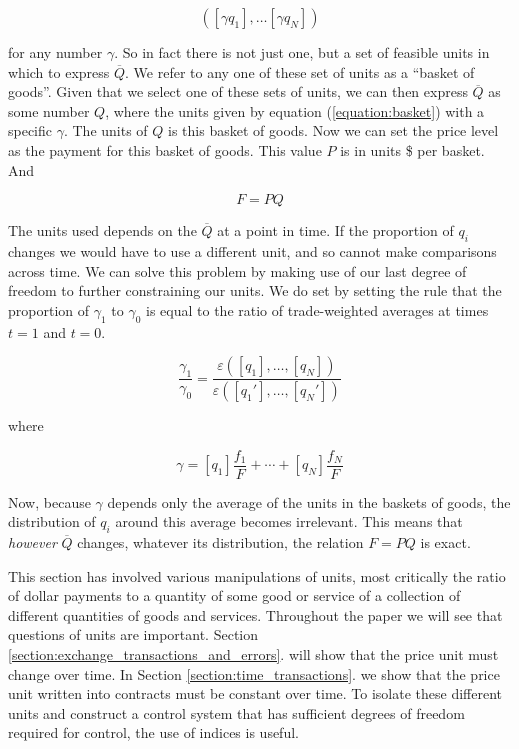 \begin{equation}\label{equation:basket}
    \left( \left[ \gamma q_1 \right], \dots \left[ \gamma q_N \right] \right)
\end{equation}

for any number $\gamma$. So in fact there is not just one, but a set of feasible units in which to
express $\overline Q$. We refer to any one of these set of units as a ``basket of goods''. Given
that we select one of these sets of units, we can then express $\overline Q$ as some number $Q$,
where the units given by equation (\ref{equation:basket}) with a specific $\gamma$. The units of
$Q$ is this basket of goods. Now we can set the price level as the payment for this basket of goods.
This value $P$ is in units \$ per basket. And

\begin{equation} \label{eq:fpq}
   F = PQ
\end{equation}

The units used depends on the $\overline Q$ at a point in time. If the proportion of $q_i$ changes
we would have to use a different unit, and so cannot make comparisons across time. We can solve this
problem by making use of our last degree of freedom to further constraining our units. We do set by
setting the rule that the proportion of $\gamma_1$ to $\gamma_0$ is equal to the ratio of
trade-weighted averages at times $t=1$ and $t=0$. 

\begin{equation}
    \frac {\gamma_1} {\gamma_0} = \frac {\varepsilon \left( \left[ q_1 \right], \dots, \left[ q_N \right] \right)}
    {\varepsilon \left( \left[ {q_1}' \right], \dots, \left[ {q_N}' \right] \right)}
\end{equation}

where

\[
    \gamma = [q_1] \frac {f_1} F + \cdots + [q_N] \frac {f_N} F 
\]

Now, because $\gamma$ depends only the average of the units in the baskets of goods, the distribution of
$q_i$ around this average becomes irrelevant. This means that \textit{however} $\overline Q$
changes, whatever its distribution, the relation $F=PQ$ is exact.  

This section has involved various manipulations of units, most critically the ratio of dollar
payments to a quantity of some good or service of a collection of different quantities of goods and
services. Throughout the paper we will see that questions of units are important. Section
\ref{section:exchange_transactions_and_errors}. will show that the price unit must change over
time. In Section \ref{section:time_transactions}. we show that the price unit written into
contracts must be constant over time. To isolate these different units and construct a control
system that has sufficient degrees of freedom required for control, the use of indices is useful.

